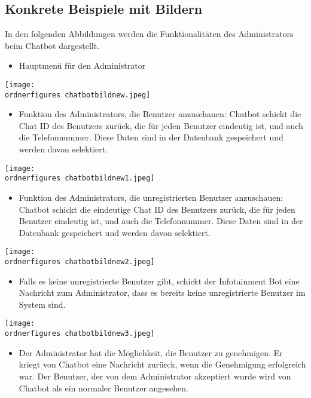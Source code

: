 \subsection{Konkrete Beispiele mit Bildern} 
In den folgenden Abbildungen werden die Funktionalitäten des Administrators beim Chatbot dargestellt.
\begin{itemize}
	\item Hauptmen\"u f\"ur den Administrator
\end{itemize}
\captionsetup{type=figure}
\texttt{[image: \\ordnerfigures chatbotbildnew.jpeg]}
\caption{Hauptmen\"u f\"ur den Administrator} 
\label{fig:menuadmin}
\begin{itemize}
	\item Funktion des Administrators, die Benutzer anzuschauen: Chatbot schickt die Chat ID des Benutzers zurück, die für jeden Benutzer eindeutig ist, und auch die Telefonnummer. Diese Daten sind in der Datenbank gespeichert und werden davon selektiert.
\end{itemize}
\captionsetup{type=figure}
\texttt{[image: \\ordnerfigures chatbotbildnew1.jpeg]}
\caption{Auflistung der Chatbot-Benutzer} 
\label{fig:chatbotbenutzer}
\begin{itemize}
	\item Funktion des Administrators, die unregistrierten Benutzer anzuschauen: Chatbot schickt die eindeutige Chat ID des Benutzers zurück, die für jeden Benutzer eindeutig ist, und auch die Telefonnummer. Diese Daten sind in der Datenbank gespeichert und werden davon selektiert.
\end{itemize}
\captionsetup{type=figure}
\texttt{[image: \\ordnerfigures chatbotbildnew2.jpeg]}
\caption{Auflistung der unregistrierten Benutzer}
\label{chatbotben}
\begin{itemize}
	\item Falls es keine unregistrierte Benutzer gibt, schickt der Infotainment Bot eine Nachricht zum Administrator, dass es bereits keine unregistrierte Benutzer im System sind.
\end{itemize}
\captionsetup{type=figure}
\texttt{[image: \\ordnerfigures chatbotbildnew3.jpeg]}
\caption{Keine Unregistrierte Benutzer}
\label{chatbotbenf}
\begin{itemize}
	\item Der Administrator hat die M\"oglichkeit, die Benutzer zu genehmigen. Er kriegt von Chatbot eine Nachricht zur\"urck, wenn die Genehmigung erfolgreich war. Der Benutzer, der von dem Administrator akzeptiert wurde wird von Chatbot als ein normaler Benutzer angesehen.
\end{itemize}
